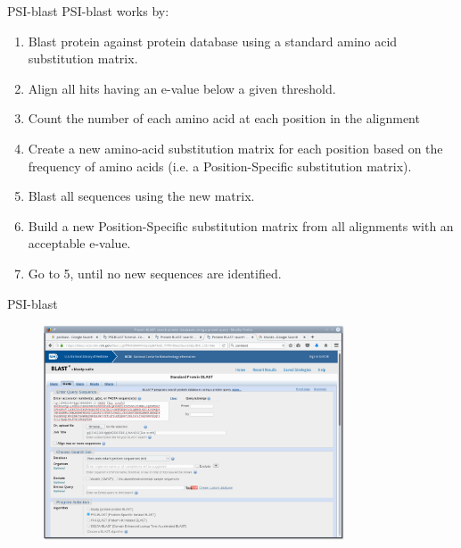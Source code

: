 \documentclass[pdf]{beamer}
\begin{document}
\begin{frame}{PSI-blast}
  PSI-blast works by:
  
  \begin{enumerate}
  \item Blast protein against protein database using a standard amino acid
    substitution matrix.
  \item Align all hits having an e-value below a given threshold.
  \item Count the number of each amino acid at each position in the alignment
  \item Create a new amino-acid substitution matrix for each position based on
    the frequency of amino acids (i.e. a Position-Specific substitution
    matrix).
  \item Blast all sequences using the new matrix.
  \item Build a new Position-Specific substitution matrix from all alignments
    with an acceptable e-value.
  \item Go to 5, until no new sequences are identified.
  \end{enumerate}
\end{frame}

\begin{frame}{PSI-blast}
  \begin{figure}[ht]
    \includegraphics[width=0.8\textwidth]{images/ncbi_psi_blast_1.png}
  \end{figure}
\end{frame}
\end{document}
